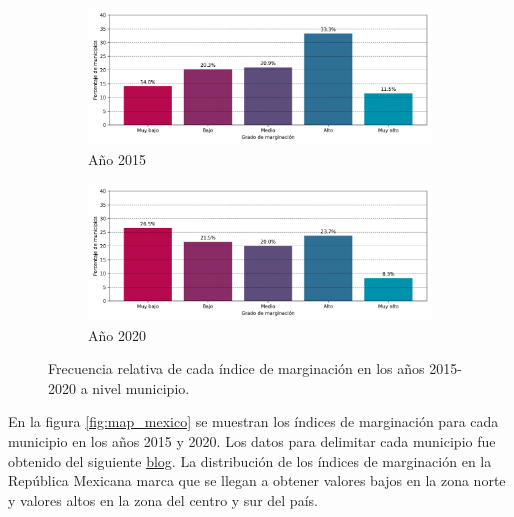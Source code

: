 \begin{figure}[H]
	\centering
	\begin{subfigure}{8.4cm}
		\caption{Año 2015}
		\includegraphics[width=1\linewidth]{Graphics/Data_2015/histogram_classes.png}
	\end{subfigure}
	\begin{subfigure}{8.4cm}
		\caption{Año 2020}
		\includegraphics[width=1\linewidth]{Graphics/Data_2020/histogram_classes.png}
	\end{subfigure}
	\caption{Frecuencia relativa de cada índice de marginación en los años 2015-2020 a nivel municipio.}
	\label{fig:frecuency_relative}
\end{figure}

En la figura \ref{fig:map_mexico} se muestran los índices de marginación para cada municipio en los años 2015 y 2020. Los datos para delimitar cada municipio fue obtenido del siguiente \href{https://blog.jjsantoso.com/mapas-distribucion-puntos/}{blog}\cite{mapa_mexico}. La distribución de los índices de marginación en la República Mexicana marca que se llegan a obtener valores bajos en la zona norte y valores altos en la zona del centro y sur del país.

